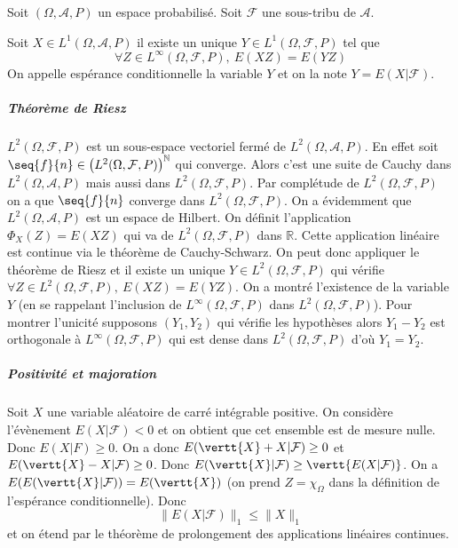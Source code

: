 \documentclass[10pt,a4paper]{article}
\begin{document}
Soit $(\Omega, \mathcal{A}, P)$ un espace probabilisé.
Soit $\mathcal{F}$ une sous-tribu de $\mathcal{A}$.

\begin{thm}
  Soit $X \in L^1(\Omega,\mathcal{A},P)$ il existe un unique $Y \in L^1(\Omega,\mathcal{F},P)$ tel que
  \[ \forall Z \in L^{\infty}(\Omega,\mathcal{F},P), \ E(XZ) = E(YZ)\]
  On appelle espérance conditionnelle la variable $Y$ et on la note $Y = E(X | \mathcal{F})$.
\end{thm}

\subparagraph{Théorème de Riesz} $L^2(\Omega,\mathcal{F},P)$ est un sous-espace vectoriel fermé de $L^2(\Omega,\mathcal{A},P)$. En effet soit $\seq{f}{n} \in \left(L^2(\Omega,\mathcal{F},P)\right)^{\mathbb{N}}$ qui converge. Alors c'est une suite de Cauchy dans $L^2(\Omega,\mathcal{A},P)$ mais aussi dans $L^2(\Omega,\mathcal{F},P)$. Par complétude de $L^2(\Omega,\mathcal{F},P)$ on a que $\seq{f}{n}$ converge dans $L^2(\Omega,\mathcal{F},P)$. On a évidemment que $L^2(\Omega,\mathcal{A},P)$ est un espace de Hilbert. On définit l'application $\Phi_X(Z)= E(XZ)$ qui va de $L^2(\Omega,\mathcal{F},P)$ dans $\mathbb{R}$. Cette application linéaire est continue via le théorème de Cauchy-Schwarz. On peut donc appliquer le théorème de Riesz et il existe un unique $Y \in L^2(\Omega,\mathcal{F},P)$ qui vérifie $\forall Z \in L^2(\Omega,\mathcal{F},P), \ E(XZ) = E(YZ)$. On a montré l'existence de la variable $Y$ (en se rappelant l'inclusion de $L^{\infty}(\Omega,\mathcal{F},P)$ dans $L^{2}(\Omega,\mathcal{F},P)$). Pour montrer l'unicité supposons $(Y_1,Y_2)$ qui vérifie les hypothèses alors $Y_1-Y_2$ est orthogonale à $L^{\infty}(\Omega,\mathcal{F},P)$ qui est dense dans $L^2(\Omega,\mathcal{F},P)$ d'où $Y_1=Y_2$.
\subparagraph{Positivité et majoration}
Soit $X$ une variable aléatoire de carré intégrable positive. On considère l'évènement $E(X|\mathcal{F})<0$ et on obtient que cet ensemble est de mesure nulle. Donc $E(X|F) \ge 0$.
On a donc $ E(\vertt{X} + X | \mathcal{F}) \ge 0$ et $ E(\vertt{X} - X | \mathcal{F}) \ge 0$. Donc
$E(\vertt{X} | \mathcal{F}) \ge \vertt{E(X | \mathcal{F})}$. On a $E(E(\vertt{X} | \mathcal{F})) = E(\vertt{X})$ (on prend $Z = \chi_{\Omega}$ dans la définition de l'espérance conditionnelle). Donc
\[ \| E(X | \mathcal{F}) \|_1 \le \|X\|_1 \]
et on étend par le théorème de prolongement des applications linéaires continues.
\end{document}
